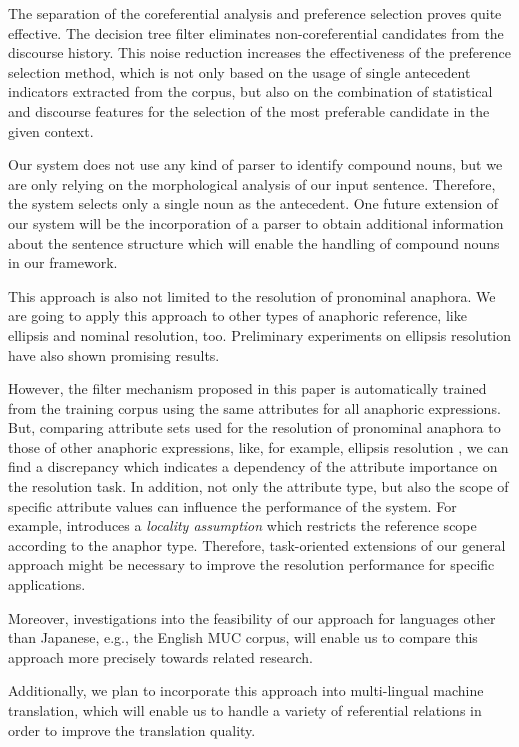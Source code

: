 The separation of the coreferential analysis and preference selection proves quite effective.
The decision tree filter eliminates non-coreferential candidates from the discourse history.
This noise reduction increases the effectiveness of the preference selection method, which
is not only based on the usage of single antecedent indicators extracted from the corpus,
but also on the combination of statistical and discourse features for the selection of the most
preferable candidate in the given context.

Our system does not use any kind of parser to identify compound nouns, but we are only
relying on the morphological analysis of our input sentence. Therefore, the system selects
only a single noun as the antecedent. One future extension of our system will be the incorporation
of a parser to obtain additional information about the sentence structure which will enable the handling
of compound nouns in our framework.

This approach is also not limited to the resolution of pronominal anaphora. We are going to apply
this approach to other types of anaphoric reference, like ellipsis and nominal resolution, too. 
Preliminary experiments on ellipsis resolution have also shown promising results.

However, the filter mechanism proposed in this paper is automatically trained from the training corpus
using the same attributes for all anaphoric expressions. But, comparing attribute sets
used for the resolution of pronominal anaphora to those of other anaphoric expressions, like,
for example, ellipsis resolution \cite{Murata97}, we can find a discrepancy which indicates
a dependency of the attribute importance on the resolution task.
In addition, not only the attribute type, but also the scope of specific attribute values can
influence the performance of the system.
For example, \cite{Kameyama97} introduces a {\em locality assumption} which restricts the reference scope
according to the anaphor type.
Therefore, task-oriented extensions of our general approach might be necessary to improve the resolution
performance for specific applications.

Moreover, investigations into the feasibility of our approach for languages other than Japanese,
e.g., the English MUC corpus, will enable us to compare this approach more precisely 
towards related research.

Additionally,  we plan to incorporate this approach into multi-lingual machine translation,
which will enable us to handle a variety of referential relations in order to improve
the translation quality.


